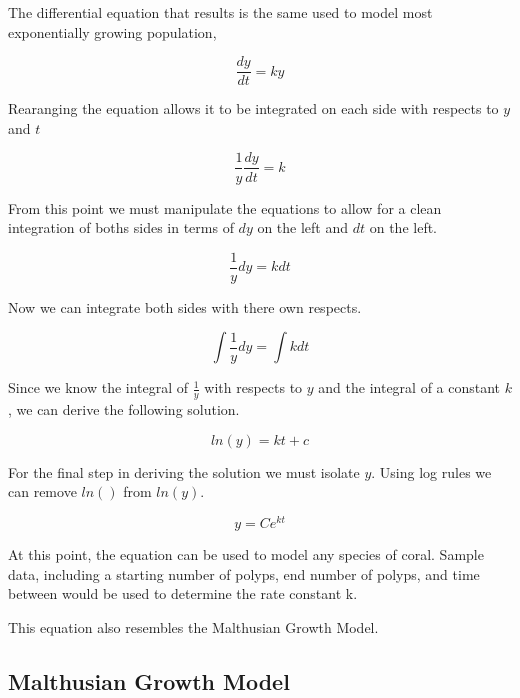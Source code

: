 \documentclass[12pt]{article}
\begin{document}
	The differential equation that results is the same used to model most exponentially growing population\cite{BaseFunction},
	
	\begin{equation}
		\frac{dy}{dt} = ky
	\end{equation}

	
	Rearanging the equation allows it to be integrated on each side with respects to $y$ and $t$
	
	\begin{equation}
		\frac{1}{y}\frac{dy}{dt}=k
	\end{equation}
	
	From this point we must manipulate the equations to allow for a clean integration of boths sides in terms of $dy$ on the left and $dt$ on the left.
	
	\begin{equation}
		\frac{1}{y}dy=kdt
	\end{equation}
	
	Now we can integrate both sides with there own respects.
	
	\begin{equation}
		\int{\frac{1}{y}}dy = \int {k}dt
	\end{equation}
	
	Since we know the integral of $\frac{1}{y}$ with respects to $y$ and the integral of a constant $k$, we can derive the following solution.
	
	\begin{equation}
		ln(y)= kt+c
	\end{equation}
	
	For the final step in deriving the solution we must isolate $y$. Using log rules we can remove $ln()$ from $ln(y)$.
	
	\begin{equation}
		y=Ce^{kt}
	\end{equation}
	
		At this point, the equation can be used to model any species of coral. Sample data, including a starting number of polyps, end number of polyps, and time between would be used to determine the rate constant k.
	
	
	 This equation also resembles the Malthusian Growth Model.
	

	\subsection{Malthusian Growth Model}	
	
\end{document}
